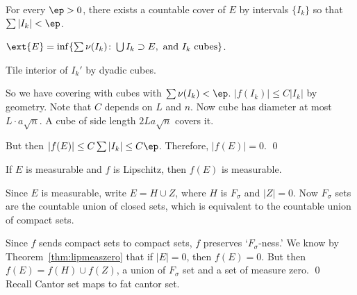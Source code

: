 \pf For every $\ep>0$, there exists a countable cover of $E$ by intervals $\{I_k\}$ so that $\sum |I_k| < \ep$. 



$\ext{E}= \inf \{ \sum \nu(I_k) \colon \bigcup I_k \supset E, \text{ and }I_k \text{ cubes}\}$.

Tile interior of $I_k'$ by dyadic cubes. 

So we have covering with cubes with $\sum \nu(I_k)<\ep$. $|f(I_k)| \leq C |I_k|$ by geometry. Note that $C$ depends on $L$ and $n$. Now cube has diameter at most $L \cdot a \sqrt{n}$. A cube of side length $2L a \sqrt{n}$ covers it. 


But then $|f(E)| \leq C \sum |I_k| \leq C\ep$. Therefore, $|f(E)|=0$. \qed \\


\begin{thm}
If $E$ is measurable and $f$ is Lipschitz, then $f(E)$ is measurable.
\end{thm}

\pf Since $E$ is measurable, write $E= H \cup Z$, where $H$ is $F_\sigma$ and $|Z|=0$. Now $F_\sigma$ sets are the countable union of closed sets, which is equivalent to the countable union of compact sets. 



Since $f$ sends compact sets to compact sets, $f$ preserves `$F_\sigma$-ness.' We know by Theorem~\ref{thm:lipmeaszero} that if $|E|=0$, then $f(E)=0$. But then $f(E)= f(H) \cup f(Z)$, a union of $F_\sigma$ set and a set of measure zero. \qed \\











Recall Cantor set maps to fat cantor set. 

